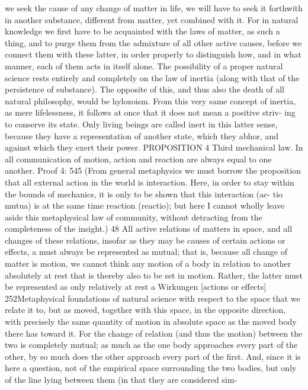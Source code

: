 we seek the cause of any change of matter in life, we will have to seek
it forthwith in another substance, different from matter, yet combined
with it. For in natural knowledge we ﬁrst have to be acquainted with the
laws of matter, as such a thing, and to purge them from the admixture of
all other active causes, before we connect them with these latter, in order
properly to distinguish how, and in what manner, each of them acts in
itself alone. The possibility of a proper natural science rests entirely and
completely on the law of inertia (along with that of the persistence of
substance). The opposite of this, and thus also the death of all natural
philosophy, would be hylozoism. From this very same concept of inertia,
as mere lifelessness, it follows at once that it does not mean a positive striv-
ing to conserve its state. Only living beings are called inert in this latter
sense, because they have a representation of another state, which they
abhor, and against which they exert their power.
PROPOSITION 4
Third mechanical law. In all communication of motion, action and reaction
are always equal to one another.
Proof
4: 545
(From general metaphysics we must borrow the proposition that all
external action in the world is interaction. Here, in order to stay within
the bounds of mechanics, it is only to be shown that this interaction (ac-
tio mutua) is at the same time reaction (reactio); but here I cannot wholly
leave aside this metaphysical law of community, without detracting from
the completeness of the insight.) 48 All active relations of matters in space,
and all changes of these relations, insofar as they may be causes of certain
actions or effects, a must always be represented as mutual; that is, because
all change of matter is motion, we cannot think any motion of a body
in relation to another absolutely at rest that is thereby also to be set in
motion. Rather, the latter must be represented as only relatively at rest
a
Wirkungen [actions or effects]
252Metaphysical foundations of natural science
with respect to the space that we relate it to, but as moved, together with
this space, in the opposite direction, with precisely the same quantity of
motion in absolute space as the moved body there has toward it. For the
change of relation (and thus the motion) between the two is completely
mutual; as much as the one body approaches every part of the other, by
so much does the other approach every part of the ﬁrst. And, since it is
here a question, not of the empirical space surrounding the two bodies,
but only of the line lying between them (in that they are considered sim-
